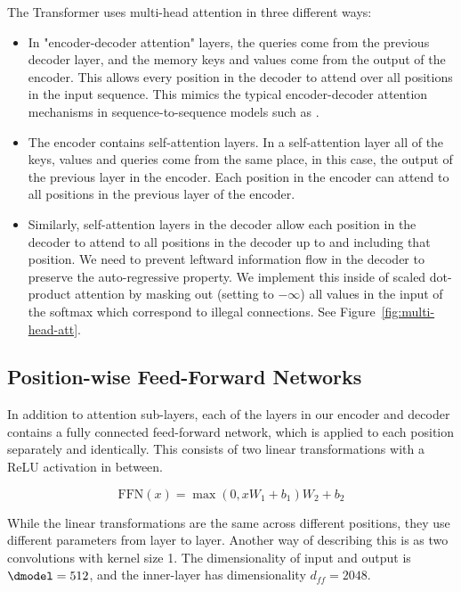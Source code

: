   The Transformer uses multi-head attention in three different ways: 
  \begin{itemize}
   \item In "encoder-decoder attention" layers, the queries come from the previous decoder layer, and the memory keys and values come from the output of the encoder.   This allows every position in the decoder to attend over all positions in the input sequence.  This mimics the typical encoder-decoder attention mechanisms in sequence-to-sequence models such as \citep{wu2016google, bahdanau2014neural,JonasFaceNet2017}.
  
   \item The encoder contains self-attention layers.  In a self-attention layer all of the keys, values and queries come from the same place, in this case, the output of the previous layer in the encoder.   Each position in the encoder can attend to all positions in the previous layer of the encoder.
  
   \item Similarly, self-attention layers in the decoder allow each position in the decoder to attend to all positions in the decoder up to and including that position.  We need to prevent leftward information flow in the decoder to preserve the auto-regressive property.  We implement this inside of scaled dot-product attention by masking out (setting to $-\infty$) all values in the input of the softmax which correspond to illegal connections.  See Figure~\ref{fig:multi-head-att}.
  
  \end{itemize}
  
  \subsection{Position-wise Feed-Forward Networks}\label{sec:ffn}
  
  In addition to attention sub-layers, each of the layers in our encoder and decoder contains a fully connected feed-forward network, which is applied to each position separately and identically.  This consists of two linear transformations with a ReLU activation in between.
  
  \begin{equation}
     \mathrm{FFN}(x)=\max(0, xW_1 + b_1) W_2 + b_2
  \end{equation}
  
  While the linear transformations are the same across different positions, they use different parameters from layer to layer. Another way of describing this is as two convolutions with kernel size 1.  The dimensionality of input and output is $\dmodel=512$, and the inner-layer has dimensionality $d_{ff}=2048$.
  

